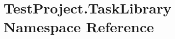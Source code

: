 \hypertarget{namespace_test_project_1_1_task_library}{}\section{Test\+Project.\+Task\+Library Namespace Reference}
\label{namespace_test_project_1_1_task_library}
